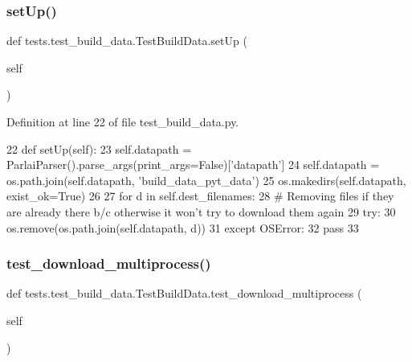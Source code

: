 \subsubsection{\texorpdfstring{set\+Up()}{setUp()}}
{\footnotesize\ttfamily def tests.\+test\+\_\+build\+\_\+data.\+Test\+Build\+Data.\+set\+Up (\begin{DoxyParamCaption}\item[{}]{self }\end{DoxyParamCaption})}



Definition at line 22 of file test\+\_\+build\+\_\+data.\+py.


\begin{DoxyCode}
22     \textcolor{keyword}{def }setUp(self):
23         self.datapath = ParlaiParser().parse\_args(print\_args=\textcolor{keyword}{False})[\textcolor{stringliteral}{'datapath'}]
24         self.datapath = os.path.join(self.datapath, \textcolor{stringliteral}{'build\_data\_pyt\_data'})
25         os.makedirs(self.datapath, exist\_ok=\textcolor{keyword}{True})
26 
27         \textcolor{keywordflow}{for} d \textcolor{keywordflow}{in} self.dest\_filenames:
28             \textcolor{comment}{# Removing files if they are already there b/c otherwise it won't try to download them again}
29             \textcolor{keywordflow}{try}:
30                 os.remove(os.path.join(self.datapath, d))
31             \textcolor{keywordflow}{except} OSError:
32                 \textcolor{keywordflow}{pass}
33 
\end{DoxyCode}
\mbox{\label{classtests_1_1test__build__data_1_1TestBuildData_a24ccc6522078dd41dbc5d608bc1297e2}} 
\subsubsection{\texorpdfstring{test\+\_\+download\+\_\+multiprocess()}{test\_download\_multiprocess()}}
{\footnotesize\ttfamily def tests.\+test\+\_\+build\+\_\+data.\+Test\+Build\+Data.\+test\+\_\+download\+\_\+multiprocess (\begin{DoxyParamCaption}\item[{}]{self }\end{DoxyParamCaption})}



